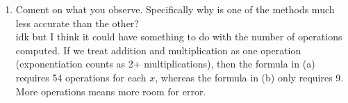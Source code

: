 \documentclass[11pt]{article}
\newcommand{\n}{\vspace{0.3cm}}
\begin{document}
\begin{enumerate}
\begin{enumerate}
		      \item Coment on what you observe.  Specifically why is one of the methods much less accurate than the other? \n\\
		            idk but I think it could have something to do with the number of operations computed.  If we treat addition and multiplication as one operation (exponentiation counts as 2+ multiplications), then the formula in (a) requires 54 operations for each \(x\), whereas the formula in (b) only requires 9.  More operations means more room for error.
	      \end{enumerate}
\end{enumerate}
\end{document}
